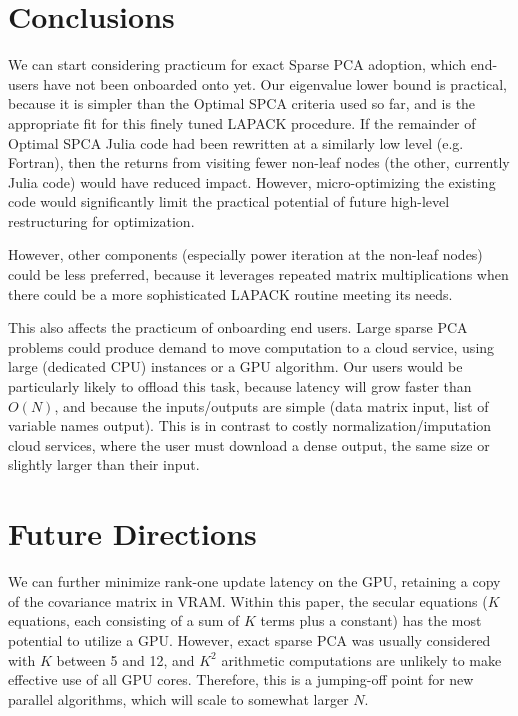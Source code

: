 \documentclass{article}
\begin{document}
\section{Conclusions}

We can start considering practicum for exact Sparse PCA adoption, which end-users have not been onboarded onto yet. Our eigenvalue lower bound is practical, because it is simpler than the Optimal SPCA criteria used so far, and is the appropriate fit for this finely tuned LAPACK procedure. If the remainder of Optimal SPCA Julia code had been rewritten at a similarly low level (e.g. Fortran), then the returns from visiting fewer non-leaf nodes (the other, currently Julia code) would have reduced impact. However, micro-optimizing the existing code would significantly limit the practical potential of future high-level restructuring for optimization.

However, other components (especially power iteration at the non-leaf nodes) could be less preferred, because it leverages repeated matrix multiplications when there could be a more sophisticated LAPACK routine meeting its needs.

This also affects the practicum of onboarding end users. Large sparse PCA problems could produce demand to move computation to a cloud service, using large (dedicated CPU) instances or a GPU algorithm. Our users would be particularly likely to offload this task, because latency will grow faster than $O(N)$, and because the inputs/outputs are simple (data matrix input, list of variable names output). This is in contrast to costly normalization/imputation cloud services, where the user must download a dense output, the same size or slightly larger than their input.

\section{Future Directions}

We can further minimize rank-one update latency on the GPU, retaining a copy of the covariance matrix in VRAM. Within this paper, the secular equations ($K$ equations, each consisting of a sum of $K$ terms plus a constant) has the most potential to utilize a GPU. However, exact sparse PCA was usually considered with $K$ between 5 and 12, and $K^2$ arithmetic computations are unlikely to make effective use of all GPU cores. Therefore, this is a jumping-off point for new parallel algorithms, which will scale to somewhat larger $N$.
\end{document}

